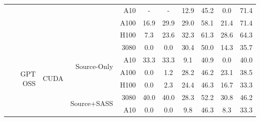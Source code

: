 \begin{table}[]
{\begin{tabular}{@{}rrrrcc|cc|cc@{}}
 &  &  & A10 & \cellcolor[rgb]{1.000,1.000,1.000}- & \cellcolor[rgb]{1.000,1.000,1.000}- & \cellcolor[rgb]{1.000,0.962,0.962}12.9 & \cellcolor[rgb]{1.000,0.719,0.719}45.2 & \cellcolor[rgb]{1.000,1.000,1.000}0.0 & \cellcolor[rgb]{1.000,0.417,0.417}71.4 \\
 &  &  & A100 & \cellcolor[rgb]{1.000,0.942,0.942}16.9 & \cellcolor[rgb]{1.000,0.855,0.855}29.9 & \cellcolor[rgb]{1.000,0.862,0.862}29.0 & \cellcolor[rgb]{1.000,0.581,0.581}58.1 & \cellcolor[rgb]{1.000,0.915,0.915}21.4 & \cellcolor[rgb]{1.000,0.417,0.417}71.4 \\
 &  &  & H100 & \cellcolor[rgb]{1.000,0.985,0.985}7.3 & \cellcolor[rgb]{1.000,0.901,0.901}23.6 & \cellcolor[rgb]{1.000,0.836,0.836}32.3 & \cellcolor[rgb]{1.000,0.543,0.543}61.3 & \cellcolor[rgb]{1.000,0.865,0.865}28.6 & \cellcolor[rgb]{1.000,0.507,0.507}64.3 \\
\midrule
\multirow{16}{*}{GPT OSS} & \multirow{8}{*}{CUDA} & \multirow{4}{*}{Source-Only} & 3080 & \cellcolor[rgb]{1.000,1.000,1.000}0.0 & \cellcolor[rgb]{1.000,1.000,1.000}0.0 & \cellcolor[rgb]{1.000,0.851,0.851}30.4 & \cellcolor[rgb]{1.000,0.670,0.670}50.0 & \cellcolor[rgb]{1.000,0.955,0.955}14.3 & \cellcolor[rgb]{1.000,0.808,0.808}35.7 \\
 &  &  & A10 & \cellcolor[rgb]{1.000,0.828,0.828}33.3 & \cellcolor[rgb]{1.000,0.828,0.828}33.3 & \cellcolor[rgb]{1.000,0.978,0.978}9.1 & \cellcolor[rgb]{1.000,0.761,0.761}40.9 & \cellcolor[rgb]{1.000,1.000,1.000}0.0 & \cellcolor[rgb]{1.000,0.769,0.769}40.0 \\
 &  &  & A100 & \cellcolor[rgb]{1.000,1.000,1.000}0.0 & \cellcolor[rgb]{1.000,0.999,0.999}1.2 & \cellcolor[rgb]{1.000,0.868,0.868}28.2 & \cellcolor[rgb]{1.000,0.709,0.709}46.2 & \cellcolor[rgb]{1.000,0.904,0.904}23.1 & \cellcolor[rgb]{1.000,0.783,0.783}38.5 \\
 &  &  & H100 & \cellcolor[rgb]{1.000,1.000,1.000}0.0 & \cellcolor[rgb]{1.000,0.998,0.998}2.3 & \cellcolor[rgb]{1.000,0.895,0.895}24.4 & \cellcolor[rgb]{1.000,0.708,0.708}46.3 & \cellcolor[rgb]{1.000,0.943,0.943}16.7 & \cellcolor[rgb]{1.000,0.828,0.828}33.3 \\
\cmidrule(lr){3-10}
 &  & \multirow{4}{*}{Source+SASS} & 3080 & \cellcolor[rgb]{1.000,0.769,0.769}40.0 & \cellcolor[rgb]{1.000,0.769,0.769}40.0 & \cellcolor[rgb]{1.000,0.867,0.867}28.3 & \cellcolor[rgb]{1.000,0.647,0.647}52.2 & \cellcolor[rgb]{1.000,0.848,0.848}30.8 & \cellcolor[rgb]{1.000,0.709,0.709}46.2 \\
 &  &  & A10 & \cellcolor[rgb]{1.000,1.000,1.000}0.0 & \cellcolor[rgb]{1.000,1.000,1.000}0.0 & \cellcolor[rgb]{1.000,0.976,0.976}9.8 & \cellcolor[rgb]{1.000,0.708,0.708}46.3 & \cellcolor[rgb]{1.000,0.981,0.981}8.3 & \cellcolor[rgb]{1.000,0.828,0.828}33.3 \\

\end{tabular}}
\end{table}
